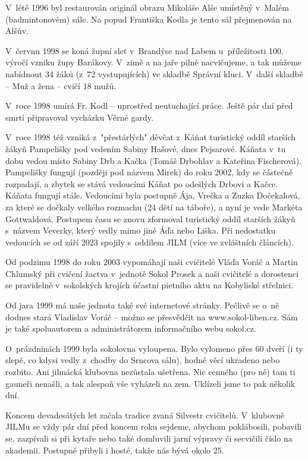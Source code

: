\documentclass[a5paper, 12pt, twoside]{article}
\begin{document}
V~létě 1996 byl restaurován originál obrazu Mikoláše Alše umístěný
v~Malém (badmintonovém) sále. Na popud Františka Kodla je tento sál
přejmenován na Alšův.

V~červnu 1998 se koná župní slet v~Brandýse nad Labem u~příležitosti
100. výročí vzniku župy Barákovy. V~zimě a na jaře pilně nacvičujeme, a
tak můžeme nabídnout 34 žáků (z~72 vystupujících) ve skladbě Správní
kluci. V~další skladbě -- Muž a žena -- cvičí 18 mužů.

V~roce 1998 umírá Fr. Kodl -- uprostřed neutuchající práce. Ještě pár
dní před smrtí připravoval vycházku Věrné gardy.

V~roce 1998 též vzniká z~"přestárlých" děvčat z~Káňat turistický oddíl
starších žákyň Pampelišky pod vedením Sabiny Hašové, dnes Pejsarové.
Káňata v~tu dobu vedou místo Sabiny Drb a Kačka (Tomáš Drbohlav a
Kateřina Fischerová). Pampelišky fungují (později pod názvem Mirek) do
roku 2002, kdy se částečně rozpadají, a zbytek se stává vedoucími Káňat
po odešlých Drbovi a Kačce. Káňata fungují stále. Vedoucími byla
postupně Ája, Vrečka a Zuzka Dočekalová, za které se dočkaly velkého
rozmachu (24 dětí na táboře), a nyní je vede Markéta Gottwaldová.
Postupem času se znovu zformoval turistický oddíl starších žákyň
s~názvem Veverky, který vedly mimo jiné Áďa nebo Liška. Při nedostatku
vedoucích se od září 2023 spojily s~oddílem JILM (více ve zvláštních
článcích).

Od podzimu 1998 do roku 2003 vypomáhají naši cvičitelé Vláďa Voráč a
Martin Chlumský při cvičení žactva v~jednotě Sokol Prosek a naši
cvičitelé a dorostenci se pravidelně v~sokolských krojích účastní
pietního aktu na Kobyliské střelnici.

Od jara 1999 má naše jednota také své internetové stránky. Pečlivě se
o~ně dodnes stará Vladislav Voráč -- možno se přesvědčit na www.sokol-liben.cz. Sám je také
spoluautorem a administrátorem informačního webu sokol.cz.

O~prázdninách 1999 byla sokolovna vyloupena. Bylo vylomeno přes 60 dveří
(i ty slepé, co kdysi vedly z~chodby do Srncova sálu), hodně věcí
ukradeno nebo rozbito. Ani jilmácká klubovna nezůstala ušetřena. Nic
cenného (pro ně) tam ti gauneři nenašli, a tak alespoň vše vyházeli na
zem. Uklízeli jsme to pak několik dní.

Koncem devadesátých let začala tradice zvaná Silvestr cvičitelů.
V~klubovně JILMu se vždy pár dní před koncem roku sejdeme, abychom
poklábosili, pobavili se, zazpívali si při kytaře nebo také domluvili
jarní výpravy či secvičili číslo na akademii. Postupně přibyli i hosté,
takže nás bývá okolo 25.
\end{document}

